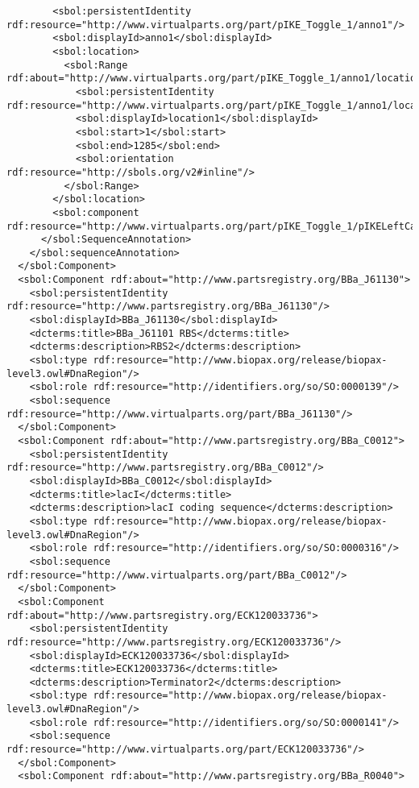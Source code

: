 \begin{lstlisting}
        <sbol:persistentIdentity rdf:resource="http://www.virtualparts.org/part/pIKE_Toggle_1/anno1"/>
        <sbol:displayId>anno1</sbol:displayId>
        <sbol:location>
          <sbol:Range rdf:about="http://www.virtualparts.org/part/pIKE_Toggle_1/anno1/location1">
            <sbol:persistentIdentity rdf:resource="http://www.virtualparts.org/part/pIKE_Toggle_1/anno1/location1"/>
            <sbol:displayId>location1</sbol:displayId>
            <sbol:start>1</sbol:start>
            <sbol:end>1285</sbol:end>
            <sbol:orientation rdf:resource="http://sbols.org/v2#inline"/>
          </sbol:Range>
        </sbol:location>
        <sbol:component rdf:resource="http://www.virtualparts.org/part/pIKE_Toggle_1/pIKELeftCassette_1"/>
      </sbol:SequenceAnnotation>
    </sbol:sequenceAnnotation>
  </sbol:Component>
  <sbol:Component rdf:about="http://www.partsregistry.org/BBa_J61130">
    <sbol:persistentIdentity rdf:resource="http://www.partsregistry.org/BBa_J61130"/>
    <sbol:displayId>BBa_J61130</sbol:displayId>
    <dcterms:title>BBa_J61101 RBS</dcterms:title>
    <dcterms:description>RBS2</dcterms:description>
    <sbol:type rdf:resource="http://www.biopax.org/release/biopax-level3.owl#DnaRegion"/>
    <sbol:role rdf:resource="http://identifiers.org/so/SO:0000139"/>
    <sbol:sequence rdf:resource="http://www.virtualparts.org/part/BBa_J61130"/>
  </sbol:Component>
  <sbol:Component rdf:about="http://www.partsregistry.org/BBa_C0012">
    <sbol:persistentIdentity rdf:resource="http://www.partsregistry.org/BBa_C0012"/>
    <sbol:displayId>BBa_C0012</sbol:displayId>
    <dcterms:title>lacI</dcterms:title>
    <dcterms:description>lacI coding sequence</dcterms:description>
    <sbol:type rdf:resource="http://www.biopax.org/release/biopax-level3.owl#DnaRegion"/>
    <sbol:role rdf:resource="http://identifiers.org/so/SO:0000316"/>
    <sbol:sequence rdf:resource="http://www.virtualparts.org/part/BBa_C0012"/>
  </sbol:Component>
  <sbol:Component rdf:about="http://www.partsregistry.org/ECK120033736">
    <sbol:persistentIdentity rdf:resource="http://www.partsregistry.org/ECK120033736"/>
    <sbol:displayId>ECK120033736</sbol:displayId>
    <dcterms:title>ECK120033736</dcterms:title>
    <dcterms:description>Terminator2</dcterms:description>
    <sbol:type rdf:resource="http://www.biopax.org/release/biopax-level3.owl#DnaRegion"/>
    <sbol:role rdf:resource="http://identifiers.org/so/SO:0000141"/>
    <sbol:sequence rdf:resource="http://www.virtualparts.org/part/ECK120033736"/>
  </sbol:Component>
  <sbol:Component rdf:about="http://www.partsregistry.org/BBa_R0040">

\end{lstlisting}
